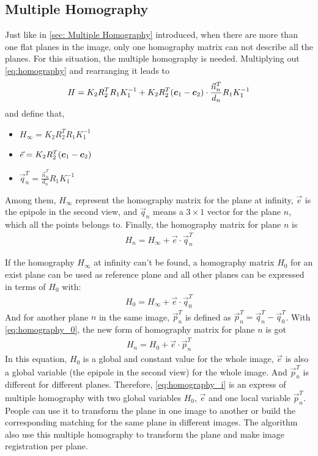 \subsection{Multiple Homography} \label{subsec: Multiple Homography calculation}
Just like in \cref{sec: Multiple Homography} introduced, when there are more than one flat planes in the image, only one homography matrix can not describe all the planes. For this situation, the multiple homography is needed. Multiplying out \cref{eq:homography} and rearranging it leads to  
\begin{align} \label{eq:Multiplehomographymatri}
	H=K_{2}R_{2}^T R_{1}K_{1}^{-1}+K_{2}R_{2}^T(\boldsymbol{c}_{1}-\boldsymbol{c}_{2})\cdot \frac{\vec{n}_n^{T}}{d_n}R_{1}K_{1}^{-1}
\end{align}
and define that,
\begin{itemize}
	\item $H_{\infty}=K_{2}R_{2}^T R_{1}K_{1}^{-1}$
	\item $\vec{e}=K_{2}R_{2}^T(\boldsymbol{c}_{1}-\boldsymbol{c}_{2})$
	\item $\vec{q}_{n}^T=\frac{\vec{n}_n^{T}}{d_n}R_{1}K_{1}^{-1}$
\end{itemize}
Among them, $H_{\infty}$ represent the homography matrix for the plane at infinity, $\vec{e}$ is the epipole in the second view, and $\vec{q}_n$ means a $3 \times 1$ vector for the plane $n$, which all the points belongs to. Finally, the homography matrix for plane $n$ is
\begin{align}\label{eq:homography_infty}
	H_{n} = H_{\infty} + \vec{e} \cdot \vec{q}_{n}^T
\end{align}

If the homography $H_{\infty}$ at infinity can't be found,  a homography matrix $H_{0}$ for an exist plane can be used as reference plane and all other planes can be expressed in terms of $H_0$ with:
\begin{align}\label{eq:homography_0}
H_{0} = H_{\infty} + \vec{e} \cdot \vec{q}_{0}^T
\end{align}
And for another plane $n$ in the same image, $\vec{p}_{n}^T$ is defined as $\vec{p}_{n}^T = \vec{q}_{n}^T -\vec{q}_{0}^T$. With \cref{eq:homography_0}, the new form of homography matrix for plane $n$ is got
\begin{align}\label{eq:homography_i}
	H_{n} = H_{0} + \vec{e} \cdot \vec{p}_{n}^T
\end{align}
In this equation, $H_{0}$ is a global and constant value for the whole image, $\vec{e}$ is also a global variable (the epipole in the second view) for the whole image. And $\vec{p}_{n}^T$ is different for different planes. Therefore,  \cref{eq:homography_i} is an express of multiple homography with two global variables $H_{0}$, $\vec{e}$ and one local variable $\vec{p}_{n}^T$. People can use it to transform the plane in one image to another or build the corresponding matching for the same plane in different images.  The algorithm also use this multiple homography to transform the plane and make image registration per plane.
